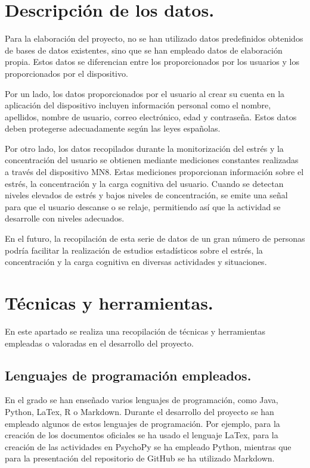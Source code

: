 
\section{Descripción de los datos.}

Para la elaboración del proyecto, no se han utilizado datos predefinidos obtenidos de bases de datos existentes, sino que se han empleado datos de elaboración propia. Estos datos se diferencian entre los proporcionados por los usuarios y los proporcionados por el dispositivo.

Por un lado, los datos proporcionados por el usuario al crear su cuenta en la aplicación del dispositivo incluyen información personal como el nombre, apellidos, nombre de usuario, correo electrónico, edad y contraseña. Estos datos deben protegerse adecuadamente según las leyes españolas.

Por otro lado, los datos recopilados durante la monitorización del estrés y la concentración del usuario se obtienen mediante mediciones constantes realizadas a través del dispositivo MN8. Estas mediciones proporcionan información sobre el estrés, la concentración y la carga cognitiva del usuario. Cuando se detectan niveles elevados de estrés y bajos niveles de concentración, se emite una señal para que el usuario descanse o se relaje, permitiendo así que la actividad se desarrolle con niveles adecuados.

En el futuro, la recopilación de esta serie de datos de un gran número de personas podría facilitar la realización de estudios estadísticos sobre el estrés, la concentración y la carga cognitiva en diversas actividades y situaciones.

\section{Técnicas y herramientas.}
En este apartado se realiza una recopilación de técnicas y herramientas empleadas o valoradas en el desarrollo del proyecto.

\subsection{Lenguajes de programación empleados.}
En el grado se han enseñado varios lenguajes de programación, como Java, Python, LaTex, R o Markdown. Durante el desarrollo del proyecto se han empleado algunos de estos lenguajes de programación. Por ejemplo, para la creación de los documentos oficiales se ha usado el lenguaje LaTex, para la creación de las actividades en PsychoPy se ha empleado Python, mientras que para la presentación del repositorio de GitHub se ha utilizado Markdown.

